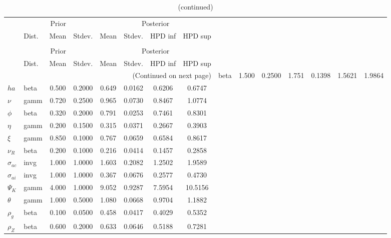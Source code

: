  
\begin{center}
\begin{longtable}{llcccccc} 
\caption{Results from Metropolis-Hastings (parameters)}
 \label{Table:MHPosterior:1}\\
\toprule 
  & \multicolumn{3}{c}{Prior}  &  \multicolumn{4}{c}{Posterior} \\
  \cmidrule(r{.75em}){2-4} \cmidrule(r{.75em}){5-8}
  & Dist. & Mean  & Stdev. & Mean & Stdev. & HPD inf & HPD sup\\
\midrule \endfirsthead 
\caption{(continued)}\\\toprule 
  & \multicolumn{3}{c}{Prior}  &  \multicolumn{4}{c}{Posterior} \\
  \cmidrule(r{.75em}){2-4} \cmidrule(r{.75em}){5-8}
  & Dist. & Mean  & Stdev. & Mean & Stdev. & HPD inf & HPD sup\\
\midrule \endhead 
\bottomrule \multicolumn{8}{r}{(Continued on next page)} \endfoot 
\bottomrule \endlastfoot 
${\sigma}$ & beta &   1.500 & 0.2500 &   1.751& 0.1398 &  1.5621 &  1.9864 \\ 
${ha}$ & beta &   0.500 & 0.2000 &   0.649& 0.0162 &  0.6206 &  0.6747 \\ 
$\nu$ & gamm &   0.720 & 0.2500 &   0.965& 0.0730 &  0.8467 &  1.0774 \\ 
${\phi}$ & beta &   0.320 & 0.2000 &   0.791& 0.0253 &  0.7461 &  0.8301 \\ 
${\eta}$ & gamm &   0.200 & 0.1500 &   0.315& 0.0371 &  0.2667 &  0.3903 \\ 
$\xi$ & gamm &   0.850 & 0.1000 &   0.767& 0.0659 &  0.6584 &  0.8617 \\ 
${\nu_R}$ & beta &   0.200 & 0.1000 &   0.216& 0.0414 &  0.1457 &  0.2858 \\ 
${\sigma_{ac}}$ & invg &   1.000 & 1.0000 &   1.603& 0.2082 &  1.2502 &  1.9589 \\ 
${\sigma_{ai}}$ & invg &   1.000 & 1.0000 &   0.367& 0.0676 &  0.2577 &  0.4730 \\ 
${\Psi_{K}}$ & gamm &   4.000 & 1.0000 &   9.052& 0.9287 &  7.5954 & 10.5156 \\ 
${\theta}$ & gamm &   1.000 & 0.5000 &   1.080& 0.0668 &  0.9704 &  1.1882 \\ 
${\rho_g}$ & beta &   0.100 & 0.0500 &   0.458& 0.0417 &  0.4029 &  0.5352 \\ 
${\rho_Z}$ & beta &   0.600 & 0.2000 &   0.633& 0.0646 &  0.5188 &  0.7281 \\ 

\end{longtable}
\end{center}
